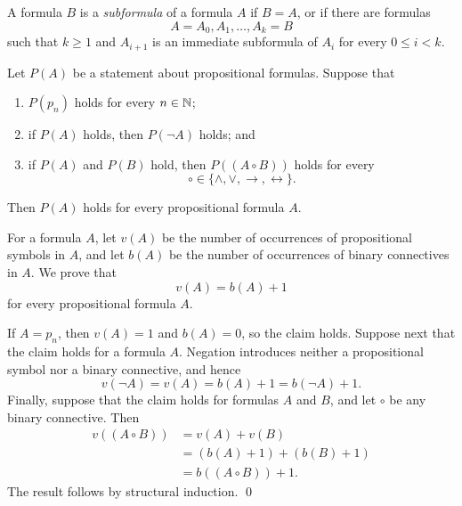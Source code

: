 \documentclass[12pt, a4paper]{article}
\begin{document}
\begin{definition}[Subformulas]
  A formula \(B\) is a \emph{subformula} of a formula \(A\) if \(B=A\), or
  if there are formulas
  \[
    A=A_0,A_1,\ldots,A_k=B
  \]
  such that \(k \geq 1\) and \(A_{i+1}\) is an immediate subformula of
  \(A_i\) for every \(0 \leq i<k\).
\end{definition}

\begin{theorem}
  Let \(P(A)\) be a statement about propositional formulas. Suppose that
  \begin{enumerate}
    \item \(P(p_n)\) holds for every \(n \in \mathbb{N}\);
    \item if \(P(A)\) holds, then \(P(\neg A)\) holds; and
    \item if \(P(A)\) and \(P(B)\) hold, then
      \(P((A \mathbin{\circ} B))\) holds for every
      \[
        \circ \in \{\land, \lor, \rightarrow, \leftrightarrow\}.
      \]
  \end{enumerate}
  Then \(P(A)\) holds for every propositional formula \(A\).
\end{theorem}

\begin{example}
  For a formula \(A\), let \(v(A)\) be the number of occurrences of
  propositional symbols in \(A\), and let \(b(A)\) be the number of
  occurrences of binary connectives in \(A\). We prove that
  \[
    v(A)=b(A)+1
  \]
  for every propositional formula \(A\).

  If \(A=p_n\), then \(v(A)=1\) and \(b(A)=0\), so the claim holds. Suppose
  next that the claim holds for a formula \(A\). Negation introduces neither
  a propositional symbol nor a binary connective, and hence
  \[
    v(\neg A)=v(A)=b(A)+1=b(\neg A)+1.
  \]
  Finally, suppose that the claim holds for formulas \(A\) and \(B\), and let
  \(\circ\) be any binary connective. Then
  \begin{align*}
    v((A \mathbin{\circ} B))
      &=v(A)+v(B) \\
      &=(b(A)+1)+(b(B)+1) \\
      &=b((A \mathbin{\circ} B))+1.
  \end{align*}
  The result follows by structural induction. \qed
\end{example}
\end{document}
